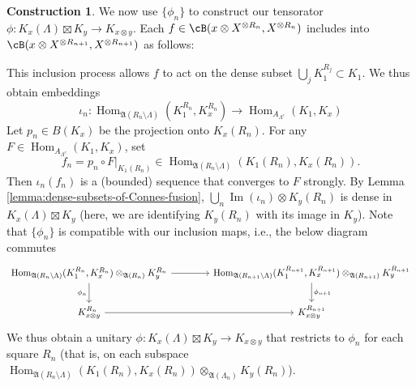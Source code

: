 \documentclass[11pt,reqno]{amsart}
\DeclareMathOperator{\Hom}{Hom}
\renewcommand{\Im}{\operatorname{Im}}
\numberwithin{equation}{section}
\theoremstyle{plain}
\theoremstyle{definition}
\newtheorem{construction}[equation]{Construction}
\begin{document}
\begin{construction}
    We now use $\{\phi_n\}$ to construct our tensorator $\phi:K_x({\Lambda})\boxtimes K_y\to K_{x\otimes y}$. Each $f\in \cB(x\otimes X^{\otimes R_n}, X^{\otimes R_n})$ includes into $\cB(x\otimes X^{\otimes R_{n+1}}, X^{\otimes R_{n+1}})$ as follows:
    \begin{center}
    \end{center}

    This inclusion process allows $f$ to act on the dense subset $\bigcup_j K_1^{R_j}\subset K_1$. We thus obtain embeddings 
    \[
    \iota_n:\Hom_{\mathfrak{A}(R_n\setminus \Lambda)}(K_1^{R_n},K_x^{R_n})\to\Hom_{A_{\Lambda^c}}(K_1,K_x)
    \]
    Let $p_n\in B(K_x)$ be the projection onto $K_x(R_n)$. For any $F\in\Hom_{A_{\Lambda^c}}(K_1,K_x)$, set 
    \[
    f_n=p_n\circ F|_{K_1(R_n)}\in \Hom_{\mathfrak{A}(R_n\setminus \Lambda)}(K_1(R_n),K_x(R_n)).
    \]
    Then $\iota_n(f_n)$ is a (bounded) sequence that converges to $F$ strongly. 
    By Lemma \ref{lemma:dense-subsets-of-Connes-fusion}, $\bigcup_n\Im(\iota_n)\otimes K_y(R_n)$ is dense in $K_x(\Lambda)\boxtimes K_y$ (here, we are identifying $K_y(R_n)$ with its image in $K_y$). Note that $\{\phi_n\}$ is compatible with our inclusion maps, i.e., the below diagram commutes
    \[\begin{tikzcd}[column sep=2em, row sep=1em]
	{\Hom_{\mathfrak{A}(R_n\setminus \Lambda)}(K_1^{R_n},K_x^{R_n})\otimes_{\mathfrak{A}(R_n)}K_y^{R_n}} && {\Hom_{\mathfrak{A}(R_{n+1}\setminus \Lambda)}(K_1^{R_{n+1}},K_x^{R_{n+1}})\otimes_{\mathfrak{A}(R_{n+1})}K_y^{R_{n+1}}} \\
	\\
	{K_{x\otimes y}^{R_n}} && {K_{x\otimes y}^{R_{n+1}}}
	\arrow[from=1-1, to=1-3]
	\arrow["{\phi_n}"', from=1-1, to=3-1]
	\arrow["{\phi_{n+1}}", from=1-3, to=3-3]
	\arrow[from=3-1, to=3-3]
\end{tikzcd}\]
    We thus obtain a unitary $\phi:K_x({\Lambda})\boxtimes K_y\to K_{x\otimes y}$ that restricts to $\phi_n$ for each square $R_n$ (that is, on each subspace $\Hom_{\mathfrak{A}(R_n\setminus \Lambda)}(K_1(R_n),K_x(R_n))\otimes_{\mathfrak{A}(\Lambda_n)}K_y(R_n)$).
\end{construction}
\end{document}
